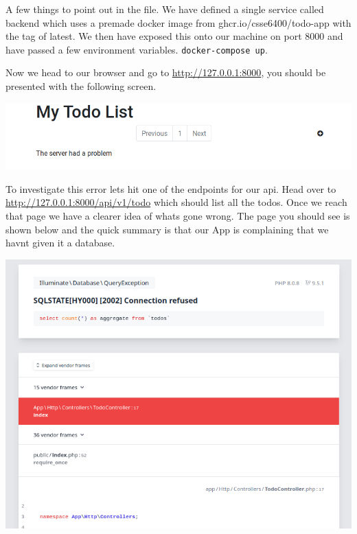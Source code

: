 \documentclass{csse4400}
\begin{document}
A few things to point out in the file. We have defined a single service called backend which uses a premade 
docker image from ghcr.io/csse6400/todo-app with the tag of latest. We then have exposed this onto our 
machine on port 8000 and have passed a few environment variables. \lstinline{docker-compose up}.


Now we head to our browser and go to \url{http://127.0.0.1:8000}, you should be presented 
with the following screen.

\includegraphics[width=\textwidth]{images/app-missing-db}

To investigate this error lets hit one of the endpoints for our api. Head over to 
\url{http://127.0.0.1:8000/api/v1/todo} which should list all the todos. Once we reach that page 
we have a clearer idea of whats gone wrong. The page you should see is shown below and the quick 
summary is that our App is complaining that we havnt given it a database.

\includegraphics[width=\textwidth]{images/missing-db}
\end{document}
